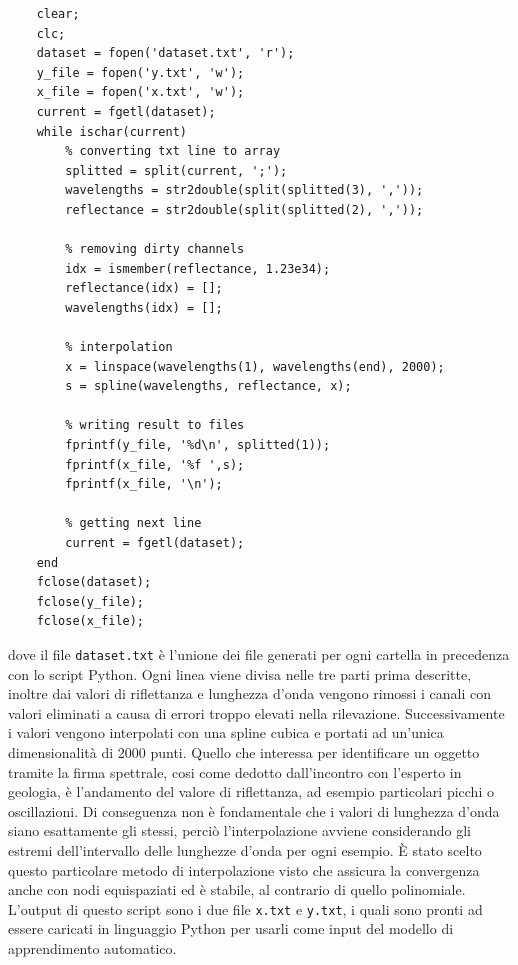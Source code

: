 \begin{lstlisting}
    clear;
    clc;
    dataset = fopen('dataset.txt', 'r');
    y_file = fopen('y.txt', 'w');
    x_file = fopen('x.txt', 'w');
    current = fgetl(dataset);
    while ischar(current)
        % converting txt line to array
        splitted = split(current, ';');
        wavelengths = str2double(split(splitted(3), ','));
        reflectance = str2double(split(splitted(2), ','));
        
        % removing dirty channels
        idx = ismember(reflectance, 1.23e34);
        reflectance(idx) = [];
        wavelengths(idx) = [];
        
        % interpolation
        x = linspace(wavelengths(1), wavelengths(end), 2000);
        s = spline(wavelengths, reflectance, x);
        
        % writing result to files
        fprintf(y_file, '%d\n', splitted(1));
        fprintf(x_file, '%f ',s);
        fprintf(x_file, '\n');
        
        % getting next line
        current = fgetl(dataset);
    end
    fclose(dataset);
    fclose(y_file);
    fclose(x_file);
\end{lstlisting}
dove il file \verb|dataset.txt| è l'unione dei file generati per ogni cartella in precedenza con lo script Python.
Ogni linea viene divisa nelle tre parti prima descritte, inoltre dai valori di riflettanza e lunghezza d'onda vengono rimossi i canali con valori eliminati a causa di errori troppo elevati nella rilevazione.
Successivamente i valori vengono interpolati con una spline cubica e portati ad un'unica dimensionalità di 2000 punti. Quello che interessa per identificare un oggetto tramite la firma spettrale, cosi come dedotto dall'incontro con l'esperto in geologia, è l'andamento del valore di riflettanza, ad esempio particolari picchi o oscillazioni. Di conseguenza non è fondamentale che i valori di lunghezza d'onda siano esattamente gli stessi, perciò l'interpolazione avviene considerando gli estremi dell'intervallo delle lunghezze d'onda per ogni esempio. È stato scelto questo particolare metodo di interpolazione visto che assicura la convergenza anche con nodi equispaziati ed è stabile, al contrario di quello polinomiale.\\
L'output di questo script sono i due file \verb|x.txt| e \verb|y.txt|, i quali sono pronti ad essere caricati in linguaggio Python per usarli come input del modello di apprendimento automatico.

